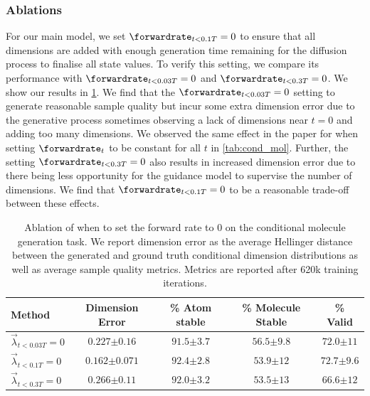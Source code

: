 \subsubsection{Ablations}
For our main model, we set $\forwardrate_{t < 0.1T} = 0$ to ensure that all dimensions are added with enough generation time remaining for the diffusion process to finalise all state values. To verify this setting, we compare its performance with $\forwardrate_{t<0.03T} = 0$ and $\forwardrate_{t<0.3T} = 0$. We show our results in \cref{tab:lowTablation}. We find that the $\forwardrate_{t<0.03T}=0$ setting to generate reasonable sample quality but incur some extra dimension error due to the generative process sometimes observing a lack of dimensions near $t=0$ and adding too many dimensions. We observed the same effect in the paper for when setting $\forwardrate_t$ to be constant for all $t$ in \cref{tab:cond_mol}. Further, the setting $\forwardrate_{t<0.3T}=0$ also results in increased dimension error due to there being less opportunity for the guidance model to supervise the number of dimensions. We find that $\forwardrate_{t<0.1T}=0$ to be a reasonable trade-off between these effects.
\begin{table}[h]
\centering
\caption{Ablation of when to set the forward rate to $0$ on the conditional molecule generation task. We report dimension error as the average Hellinger distance between the generated and ground truth conditional dimension distributions as well as average sample quality metrics. Metrics are reported after 620k training iterations.}
\begin{tabular}{@{}lcccc@{}}
\toprule
Method & Dimension  Error & \% Atom stable & \% Molecule Stable & \% Valid \\ \midrule
$ \overrightarrow{\lambda}_{t < 0.03T} = 0$ & $0.227 {\scriptstyle \pm 0.16}$ & $91.5 {\scriptstyle \pm 3.7} $  & $56.5 {\scriptstyle \pm 9.8}$ & $72.0 {\scriptstyle \pm 11}$  \\
$ \overrightarrow{\lambda}_{t < 0.1T} = 0$ & $0.162 {\scriptstyle \pm 0.071}$ & $92.4 {\scriptstyle \pm 2.8}$ & $53.9 {\scriptstyle \pm 12}$ & $72.7 {\scriptstyle \pm 9.6}$ \\
$ \overrightarrow{\lambda}_{t < 0.3T} = 0$ & $0.266 {\scriptstyle \pm 0.11}$ & $92.0 {\scriptstyle \pm 3.2}$ & $53.5 {\scriptstyle \pm 13}$ & $66.6 {\scriptstyle \pm 12}$ \\
\bottomrule
\end{tabular}
\label{tab:lowTablation}
\end{table}

